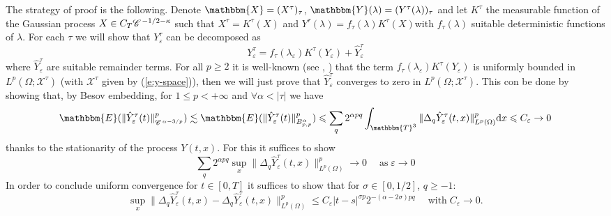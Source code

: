 \documentclass[a4paper,11pt]{article}
\newcommand{\mathd}{\mathrm{d}}
\newcommand{\tmop}[1]{\ensuremath{\operatorname{#1}}}
\newcommand{\CC}{\mathscr{C} \hspace{.1em}}
\begin{document}
The strategy of proof is the following. Denote $\mathbbm{X}=
(X^{\tau})_{\tau}$, $\mathbbm{Y} (\lambda) = (Y^{\tau} (\lambda))_{\tau}$ and
let $K^{\tau}$ the measurable function of the Gaussian process $X \in C_T
\CC^{- 1 / 2 - \kappa}$ such that $X^{\tau} = K^{\tau} (X)$ and $Y^{\tau}
(\lambda) = f_{\tau} (\lambda) K^{\tau} (X)$\quad with $f_{\tau} (\lambda)$
suitable deterministic functions of $\lambda$. For each $\tau$ we will show
that $Y^{\tau}_{\varepsilon}$ can be decomposed as
\begin{equation}
  Y^{\tau}_{\varepsilon} = f_{\tau} (\lambda_{\varepsilon}) K^{\tau}
  (Y_{\varepsilon}) + \hat{Y}^{\tau}_{\varepsilon}  \label{eq:decomp-chaos}
\end{equation}
where $\hat{Y}^{\tau}_{\varepsilon}$ are suitable remainder terms. For all $p
\geqslant 2$ it is well-known (see {\cite{catellier_paracontrolled_2013}},
{\cite{hairer_theory_2014}}) that the term $f_{\tau} (\lambda_{\varepsilon})
K^{\tau} (Y_{\varepsilon})$ is uniformly bounded in $L^p (\Omega ;
\mathcal{X}^{\tau})$ (with $\mathcal{X}^{\tau}$ given by (\ref{e:y-space})),
then we will just prove that $\hat{Y}^{\tau}_{\varepsilon}$ converges to zero
in $L^p (\Omega ; \mathcal{X}^{\tau})$. This con be done by showing that, by
Besov embedding, for $1 \leqslant p < + \infty$ and $\forall \alpha < | \tau
|$ we have
\begin{equation}
  \mathbbm{E} (\| \hat{Y}^{\tau}_{\varepsilon} (t) \|_{\CC^{\alpha - 3 /
  p}}^p) \lesssim \mathbbm{E} (\| \hat{Y}_{\varepsilon}^{\tau} (t)
  \|^p_{B^{\alpha}_{p, p}}) \leqslant \sum_q 2^{\alpha pq}
  \int_{\mathbbm{T}^3}  \| \Delta_q \hat{Y}_{\varepsilon}^{\tau} (t, x)
  \|^p_{L^p (\Omega)} \mathd x \leqslant C_{\varepsilon} \rightarrow 0
  \label{e:besov-bound}
\end{equation}
thanks to the stationarity of the process $Y (t, x)$. For this it suffices to
show
\begin{equation}
  \sum_q 2^{\alpha pq} \sup_x  \| \Delta_q \hat{Y}_{\varepsilon}^{\tau} (t, x)
  \|^p_{L^p (\Omega)} \rightarrow 0 \quad \tmop{as} \varepsilon \rightarrow 0
  \label{e:check-conv-1}
\end{equation}
In order to conclude uniform convergence for $t \in [0, T]$ it suffices to
show that for $\sigma \in [0, 1 / 2]$, $q \geqslant - 1$:
\begin{equation}
  \sup_x  \| \Delta_q \hat{Y}_{\varepsilon}^{\tau} (t, x) - \Delta_q
  \hat{Y}_{\varepsilon}^{\tau} (t, x) \|^p_{L^p (\Omega)} \leqslant
  C_{\varepsilon} | t - s |^{\sigma p} 2^{- (\alpha - 2 \sigma) pq} \quad
  \tmop{with} C_{\varepsilon} \rightarrow 0. \label{e:check-conv-2}
\end{equation}
\end{document}
